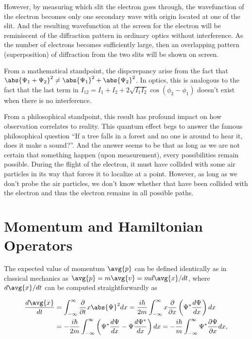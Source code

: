 \documentclass[a4paper,12pt]{report}
\begin{document}
However, by measuring which slit the electron goes through, the wavefunction of the electron becomes only one secondary wave with origin located at one of the slit. And the resulting wavefunction at the screen for the electron will be reminiscent of the diffraction pattern in ordinary optics without interference. As the number of electrons becomes sufficiently large, then an overlapping pattern (superposition) of diffraction from the two slits will be shown on screen.

From a mathematical standpoint, the dispcrepancy arise from the fact that \(\abs{\Psi_1 + \Psi_2}^2 \neq \abs{\Psi_1}^2 + \abs{\Psi_2}^2\). In optics, this is analogous to the fact that the last term in \(I_{12} = I_1 + I_2 + 2\sqrt{I_1I_2} \cos(\phi_2 - \phi_1)\) doesn't exist when there is no interference. 

From a philosophical standpoint, this result has profound impact on how observation correlates to reality. This quantum effect begs to answer the famous philosophical question ``If a tree falls in a forest and no one is around to hear it, does it make a sound?''. And the answer seems to be that as long as we are not certain that something happen (upon measurement), every possibilities remain possible. During the flight of the electron, it must have collided with some air particles in its way that forces it to localize at a point. However, as long as we don't probe the air particles, we don't know whether that have been collided with the electron and thus the electron remains in all possible paths.

\section{Momentum and Hamiltonian Operators}
	
The expected value of momentum \(\avg{p} \) can be defined identically as in classical mechanics as \(\avg{p} =m\avg{v} =md \avg{x} /dt\), where \(d \avg{x} /dt \) can be computed straightforwardly as 
	
\begin{equation}
  \begin{aligned}
    \frac{ d\avg{x} }{ dt} &= \int_{-\infty}^{\infty} \frac{\partial }{\partial t} x \abs{\Psi }^2 dx = \frac{i\hbar }{2m} \int_{-\infty}^{\infty} x \frac{\partial }{\partial x} \left(\Psi ^* \frac{d\Psi}{dx} \right)dx \\ &= -\frac{i\hbar }{2m} \int_{-\infty}^{\infty} \left(\Psi ^* \frac{ d\Psi }{ dx} - \Psi \frac{ d\Psi ^*}{ dx} \right) dx = -\frac{i\hbar }{m} \int_{-\infty}^{\infty} \Psi ^* \frac{\partial \Psi }{\partial x} dx,          
  \end{aligned}
\end{equation}
	
\end{document}

